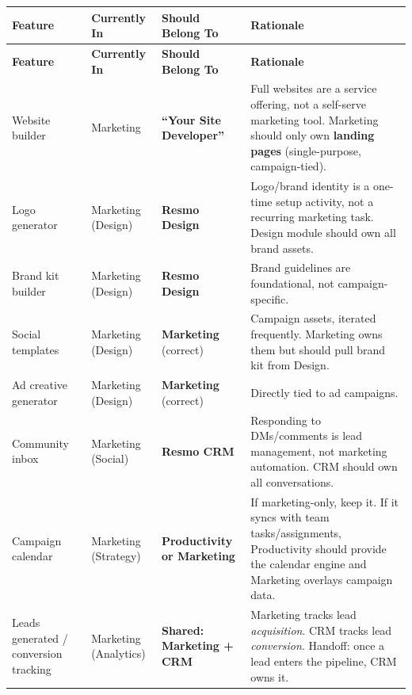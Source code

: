 \documentclass[12pt,a4paper]{article}
\begin{document}
\begin{center}
\small
\begin{longtable}{>{\raggedright\arraybackslash}p{3.2cm}
                   >{\raggedright\arraybackslash}p{3cm}
                   >{\raggedright\arraybackslash}p{3cm}
                   >{\raggedright\arraybackslash}p{4.5cm}}
\toprule
\textbf{Feature} & \textbf{Currently In} & \textbf{Should Belong To} & \textbf{Rationale} \\
\midrule
\endfirsthead
\toprule
\textbf{Feature} & \textbf{Currently In} & \textbf{Should Belong To} & \textbf{Rationale} \\
\midrule
\endhead
\bottomrule
\endlastfoot

Website builder &
Marketing &
\textbf{``Your Site Developer''} &
Full websites are a service offering, not a self-serve marketing tool. Marketing should only own \textbf{landing pages} (single-purpose, campaign-tied). \\
\midrule

Logo generator &
Marketing (Design) &
\textbf{Resmo Design} &
Logo/brand identity is a one-time setup activity, not a recurring marketing task. Design module should own all brand assets. \\
\midrule

Brand kit builder &
Marketing (Design) &
\textbf{Resmo Design} &
Brand guidelines are foundational, not campaign-specific. \\
\midrule

Social templates &
Marketing (Design) &
\textbf{Marketing} (correct) &
Campaign assets, iterated frequently. Marketing owns them but should pull brand kit from Design. \\
\midrule

Ad creative generator &
Marketing (Design) &
\textbf{Marketing} (correct) &
Directly tied to ad campaigns. \\
\midrule

Community inbox &
Marketing (Social) &
\textbf{Resmo CRM} &
Responding to DMs/comments is lead management, not marketing automation. CRM should own all conversations. \\
\midrule

Campaign calendar &
Marketing (Strategy) &
\textbf{Productivity or Marketing} &
If marketing-only, keep it. If it syncs with team tasks/assignments, Productivity should provide the calendar engine and Marketing overlays campaign data. \\
\midrule

Leads generated / conversion tracking &
Marketing (Analytics) &
\textbf{Shared: Marketing + CRM} &
Marketing tracks lead \textit{acquisition}. CRM tracks lead \textit{conversion}. Handoff: once a lead enters the pipeline, CRM owns it. \\
\midrule


\end{longtable}
\end{center}
\end{document}
